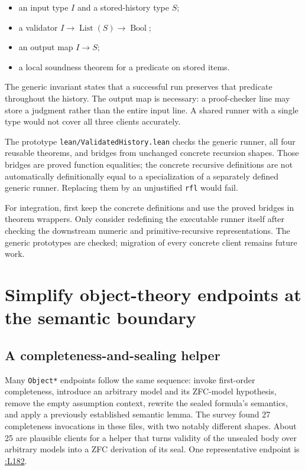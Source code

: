 \documentclass[11pt,letterpaper]{article}
\newcommand{\src}[2]{\href{https://github.com/VladimirReshetnikov/ProveIt/blob/60e9c5d620c6c387d932876cfa2d9376f64ea56c/Computability/DiophantineConsistency/Lean/DiophantineConsistency/#1.lean\#L#2}{\texttt{\detokenize{#1}}:L#2}}
\newcommand{\artifact}[1]{\nolinkurl{#1}}
\begin{document}
\begin{itemize}
\item an input type $I$ and a stored-history type $S$;
\item a validator $I\to\operatorname{List}(S)\to\operatorname{Bool}$;
\item an output map $I\to S$;
\item a local soundness theorem for a predicate on stored items.
\end{itemize}

The generic invariant states that a successful run preserves that predicate
throughout the history. The output map is necessary: a proof-checker line
may store a judgment rather than the entire input line. A shared runner
with a single type would not cover all three clients accurately.

The prototype \artifact{lean/ValidatedHistory.lean} checks the generic
runner, all four reusable theorems, and bridges from unchanged concrete
recursion shapes. Those bridges are proved function equalities; the
concrete recursive definitions are not automatically definitionally equal
to a specialization of a separately defined generic runner. Replacing
them by an unjustified \texttt{rfl} would fail.

For integration, first keep the concrete definitions and use the proved
bridges in theorem wrappers. Only consider redefining the executable
runner itself after checking the downstream numeric and primitive-recursive
representations. The generic prototypes are checked; migration of every
concrete client remains future work.

\section{Simplify object-theory endpoints at the semantic boundary}

\subsection{A completeness-and-sealing helper}

Many \texttt{Object*} endpoints follow the same sequence: invoke first-order
completeness, introduce an arbitrary model and its ZFC-model hypothesis,
remove the empty assumption context, rewrite the sealed formula's
semantics, and apply a previously established semantic lemma. The survey
found 27 completeness invocations in these files, with two notably
different shapes. About 25 are plausible clients for a helper that turns
validity of the unsealed body over arbitrary models into a ZFC derivation of its seal. One representative endpoint is \src{ObjectNaturalExpression}{182}.
\end{document}
